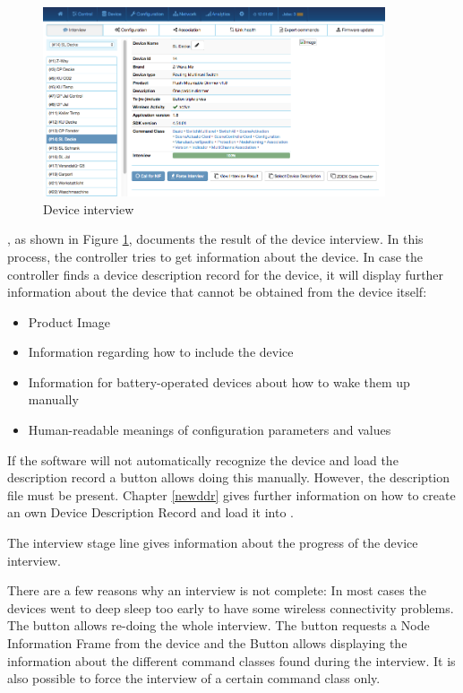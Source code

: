\begin{figure}
\begin{center}
\includegraphics[width=0.9\textwidth]{pngs/cap7/eui31.png}
\caption{Device interview}
\label{eui31}
\end{center}
\end{figure}

, as shown in Figure \ref{eui31}, documents the result of 
the device interview. In this process, the controller tries to get information about the 
device. In case the controller finds a device description record for the device, it 
will display further information about the device that cannot be obtained from the device itself:

\begin{itemize}
\item Product Image
\item Information regarding how to include the device
\item Information for battery-operated devices about how to wake them up manually
\item Human-readable meanings of configuration parameters and values
\end{itemize}

If the software will not automatically recognize the device and load the description 
record a button  allows doing this manually. However, 
the description file must be present. Chapter \ref{newddr} gives further information on 
how to create an own Device Description Record and load it into \zway.

The interview stage line gives information about the progress of the device interview.

There are a few reasons why an interview is not complete: In most cases the devices went 
to deep sleep too early to have some wireless connectivity problems. The 
button  allows re-doing the whole interview. The button  
requests a Node Information Frame from the device and the Button  
allows displaying the information about the different command classes found during the 
interview. It is also possible to force the interview of a certain command class only.

